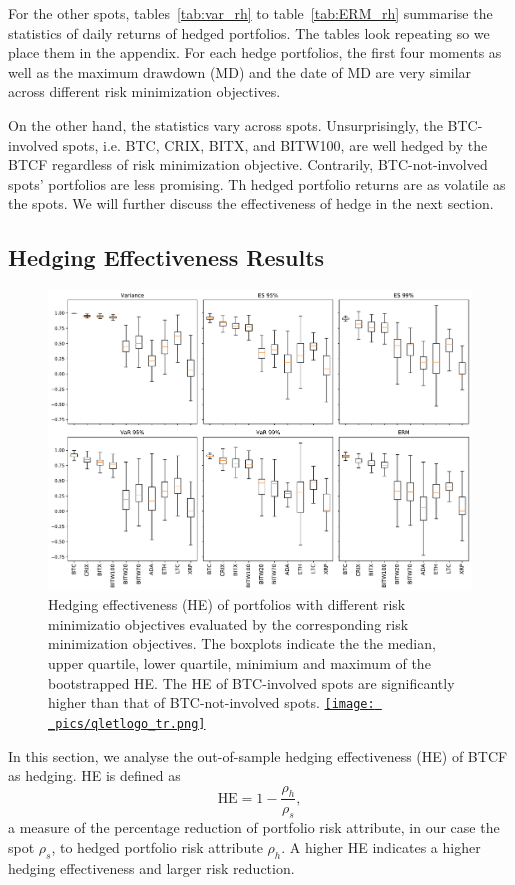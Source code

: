 For the other spots, tables~\ref{tab:var_rh} to table~\ref{tab:ERM_rh} summarise the statistics
of daily returns of hedged portfolios.
The tables look repeating so we place them in the appendix.
For each hedge portfolios,
the first four moments as well as the maximum drawdown (MD) and the date of MD are very similar across different risk minimization objectives. \medskip

On the other hand, the statistics vary across spots.
Unsurprisingly, the BTC-involved spots, i.e. BTC, CRIX, BITX, and BITW100, are well hedged by the BTCF regardless of risk minimization objective.
Contrarily, BTC-not-involved spots' portfolios are less promising.
Th hedged portfolio returns are as volatile as the spots.
We will further discuss the effectiveness of hedge in the next section. %

\subsection{Hedging Effectiveness Results}\label{sec: HE results}
\begin{figure}[t]
\includegraphics[width=\textwidth]{_pics/ES5_HE_boxplot.pdf}
  \caption{Hedging effectiveness (HE) of portfolios with different risk minimizatio objectives evaluated by the corresponding risk minimization objectives.
            The boxplots indicate the the median, upper quartile, lower quartile, minimium and maximum of the bootstrapped HE.
            The HE of BTC-involved spots are significantly higher than that of BTC-not-involved spots.
  \href{http://www.quantlet.com/}{\texttt{[image: \_pics/qletlogo\_tr.png]}} }
\label{fig:HEboxplot}
\end{figure}
In this section, we analyse the out-of-sample hedging effectiveness (HE) of BTCF as hedging.
HE is defined as $$\text{HE} = 1-\frac{\rho_h}{\rho_s},$$
a measure of the percentage reduction of portfolio risk attribute, in our case the spot $\rho_s$,
to hedged portfolio risk attribute $\rho_h$.
A higher HE indicates a higher hedging effectiveness and larger risk reduction. \medskip

